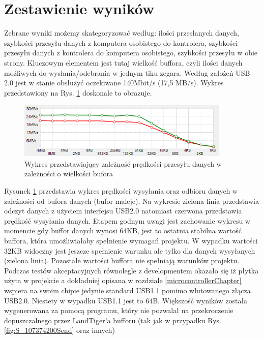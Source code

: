 \documentclass{BscUS}
\begin{document}
\section{Zestawienie wyników}
\indent Zebrane wyniki możemy skategoryzować według: ilości przesłanych danych, szybkości przesyłu danych z komputera osobistego do kontrolera, szybkości przesyłu danych z kontrolera do komputera osobistego, szybkości przesyłu w obie strony. Kluczowym elementem jest tutaj wielkość buffora, czyli ilości danych możliwych do wysłania/odebrania w jednym tiku zegara.
\newline
\indent Według założeń USB 2.0 jest w stanie obsłużyć oczekiwane 140Mbit/s (17,5 MB/s). Wykres przedstawiony na Rys. \ref{fig:speedTest} doskonale to obrazuje.
\begin{figure}[H]
\centering
\includegraphics[width=0.9\textwidth]{./img/speedTest}
\caption{Wykres przedstawiający zależność prędkości przesyłu danych w zależności o wielkości bufora}
\label{fig:speedTest}
\end{figure}
Rysunek \ref{fig:speedTest} przedstawia wykres prędkości wysyłania oraz odbioru danych w zależności od bufora danych (bufor maleje). Na wykresie zielona linia przedstawia odczyt danych z użyciem interfejsu USB2.0 natomiast czerwona przedstawia prędkość wysyłania danych. Etapem godnym uwagi jest zachowanie wykresu w momencie gdy buffor danych wynosi 64KB, jest to ostatnia stabilna wartość buffora, która umożliwiałaby spełnienie wymagań projektu. W wypadku wartości 32KB widoczny jest jeszcze spełnienie warunku ale tylko dla danych wysyłanych (zielona linia). Pozostałe wartości buffora nie spełniają warunków projektu.
\newline
\indent Podczas testów akceptacyjnych równolegle z developmentem okazało się iż płytka użyta w projekcie a dokładniej opisana w rozdziale \ref{microcontrollerChapter} wspiera na swoim chipie jedynie standard USB1.1 pomimo wlutowanego złącza USB2.0. Niestety w wypadku USB1.1 jest to 64B. Większość wyników została wygenerowana za pomocą programu, który nie pozwalał na przekroczenie dopuszczalnego przez LandTiger'a bufforu (tak jak w przypadku Rys. \ref{fig:S_107374200Send} oraz innych)
\newline
\end{document}
